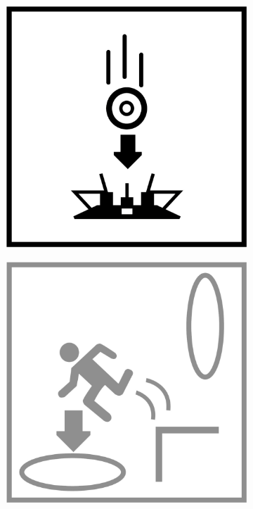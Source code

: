 \begin{figure}[H]
\begin{subfigure}[l]{0.195\linewidth}
  \end{subfigure}
  \begin{subfigure}[l]{0.195\linewidth}
    \includegraphics[width=\textwidth]{Sources/PortalIcons/4.jpg}
  \end{subfigure}
  \begin{subfigure}[l]{0.195\linewidth}
    \includegraphics[width=\textwidth]{Sources/PortalIcons/d5.jpg}
  \end{subfigure}
  

\end{figure}
